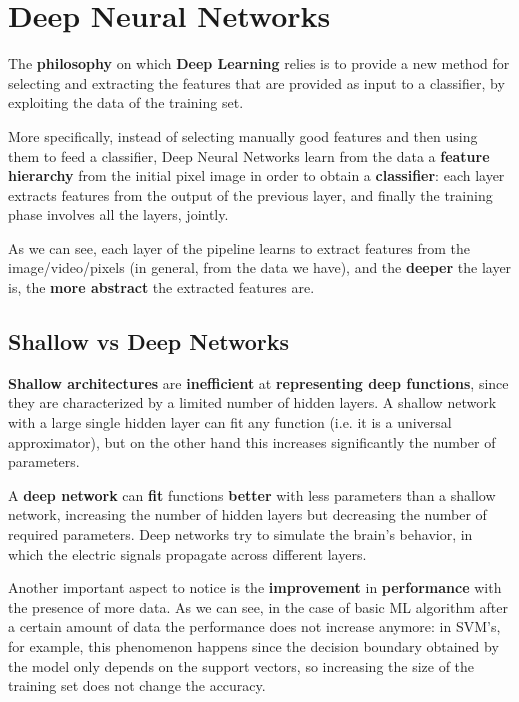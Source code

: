 \section{Deep Neural Networks}
The \textbf{philosophy} on which \textbf{Deep Learning} relies is to provide a new method for selecting and extracting the features that are provided as input to a classifier, by exploiting the data of the training set. 

More specifically, instead of selecting manually good features and then using them to feed a classifier, Deep Neural Networks learn from the data a \textbf{feature hierarchy} from the initial pixel image in order to obtain a \textbf{classifier}: each layer extracts features from the output of the previous layer, and finally the training phase involves all the layers, jointly.

As we can see, each layer of the pipeline learns to extract features from the image/video/pixels (in general, from the data we have), and the \textbf{deeper} the layer is, the \textbf{more abstract} the extracted features are.

\subsection{Shallow vs Deep Networks} \textbf{Shallow architectures} are \textbf{inefficient} at \textbf{representing deep functions}, since they are characterized by a limited number of hidden layers. A shallow network with a large single hidden layer can fit any function (i.e. it is a universal approximator), but on the other hand this increases significantly the number of parameters. 

A \textbf{deep network} can \textbf{fit} functions \textbf{better} with less parameters than a shallow network, increasing the number of hidden layers but decreasing the number of required parameters. Deep networks try to simulate the brain's behavior, in which the electric signals propagate across different layers.

Another important aspect to notice is the \textbf{improvement} in \textbf{performance} with the presence of more data.
As we can see, in the case of basic ML algorithm after a certain amount of data the performance does not increase anymore: in SVM's, for example, this phenomenon happens since the decision boundary obtained by the model only depends on the support vectors, so increasing the size of the training set does not change the accuracy.

